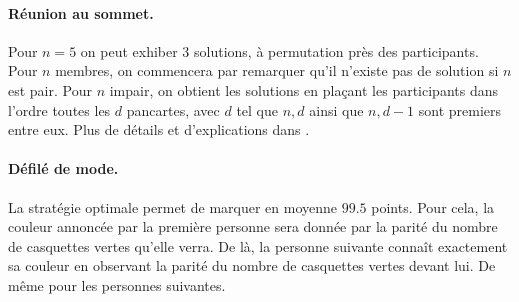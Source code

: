 \documentclass[a4paper,10pt,oneside]{article}
\begin{document}
\paragraph*{Réunion au sommet.}
Pour $n=5$ on peut exhiber 3 solutions, à permutation près des participants.
Pour $n$ membres, on commencera par remarquer qu'il n'existe pas de solution si $n$ est pair.
Pour $n$ impair, on obtient les solutions en plaçant les participants dans l'ordre toutes les $d$ pancartes, avec $d$ tel que $n,d$ ainsi que $n,d-1$ sont premiers entre eux. 
Plus de détails et d'explications dans \cite{godotSituationsRechercheJeux2005}.

\paragraph*{Défilé de mode.}
La stratégie optimale permet de marquer en moyenne $99.5$ points.
Pour cela, la couleur annoncée par la première personne sera donnée par la parité du nombre de casquettes vertes qu'elle verra.
De là, la personne suivante connaît exactement sa couleur en observant la parité du nombre de casquettes vertes devant lui.
De même pour les personnes suivantes.



  

\end{document}
